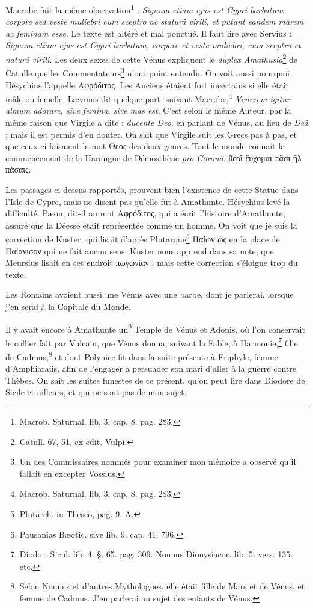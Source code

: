 \documentclass[a4paper, 11pt, oneside, polutonikogreek, french]{article}
\begin{document}
Macrobe fait la même observation\footnote{Macrob. Saturnal. lib. 3. cap. 8. pag. 283.} : \emph{Signum etiam ejus est Cypri barbatum corpore sed veste muliebri cum sceptro ac staturâ virili, et putant eandem marem ac feminam esse}. Le texte est altéré et mal ponctué. Il faut lire avec Servius : \emph{Signum etiam ejus est Cypri barbatum, corpore et veste muliebri, cum sceptro et naturâ virili}. Les deux sexes de cette Vénus expliquent le \emph{duplex Amathusia}\footnote{Catull. 67, 51, ex edit. Vulpi.} de Catulle que les Commentateurs\footnote{Un des Commissaires nommés pour examiner mon mémoire a observé qu'il fallait en excepter Vossius.} n'ont point entendu. On voit aussi pourquoi Hésychius l'appelle Αφρόδιτος. Les Anciens étaient fort incertains si elle était mâle ou femelle. Lævinus dit quelque part, suivant Macrobe,\footnote{Macrob. Saturnal. lib. 3. cap. 8. pag. 283.} \emph{Venerem igitur almum adorare, sive femina, sive mas est}. C'est selon le même Auteur, par la même raison que Virgile a dite : \emph{ducente Deo}, en parlant de Vénus, au lieu de \emph{Deâ} ; mais il est permis d'en douter. On sait que Virgile suit les Grecs pas à pas, et que ceux-ci faisaient le mot Θεος des deux genres. Tout le monde connait le commencement de la Harangue de Démosthène \emph{pro Coronâ}. θεοῖ ἔυχομαι πᾶσι ὴλ πάσαις.

Les passages ci-dessus rapportés, prouvent bien l'existence de cette Statue dans l'Isle de Cypre, mais ne disent pas qu'elle fut à Amathunte. Hésychius levé la difficulté. Pæon, dit-il au mot Αφρόδιτος, qui a écrit l'histoire d'Amathunte, assure que la Déesse était représentée comme un homme. On voit que je suis la correction de Kuster, qui lisait d'après Plutarque\footnote{Plutarch. in Theseo, pag. 9. A.} Παίων ὡς en la place de Παίανισον qui ne fait aucun sens. Kuster nous apprend dans sa note, que Meursius lisait en cet endroit πωγωνίαν ; mais cette correction s'éloigne trop du texte.

Les Romains avoient aussi une Vénus avec une barbe, dont je parlerai, lorsque j'en serai à la Capitale du Monde.

Il y avait encore à Amathunte un\footnote{Pausanias Bæotic. sive lib. 9. cap. 41. 796.} Temple de Vénus et Adonis, où l'on conservait le collier fait par Vulcain, que Vénus donna, suivant la Fable, à Harmonie,\footnote{Diodor. Sicul. lib. 4. §. 65. pag. 309. Nonnus Dionysiacor. lib. 5. vers. 135. etc.} fille de Cadmus,\footnote{Selon Nonnus et d'autres Mythologues, elle était fille de Mars et de Vénus, et femme de Cadmus. J'en parlerai au sujet des enfants de Vénus.} et dont Polynice fit dans la suite présente à Eriphyle, femme d'Amphiaraiis, afin de l'engager à persuader son mari d'aller à la guerre contre Thèbes. On sait les suites funestes de ce présent, qu'on peut lire dans Diodore de Sicile et ailleurs, et qui ne sont pas de mon sujet.
\end{document}
